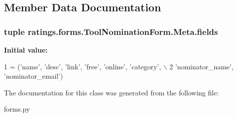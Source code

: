 \subsection{Member Data Documentation}
\hypertarget{classratings_1_1forms_1_1ToolNominationForm_1_1Meta_a1193d82ba3689ee8fcd68dc919d9b375}{
\subsubsection[{fields}]{\setlength{\rightskip}{0pt plus 5cm}tuple ratings.\-forms.\-Tool\-Nomination\-Form.\-Meta.\-fields\hspace{0.3cm}{\ttfamily [static]}}}\label{classratings_1_1forms_1_1ToolNominationForm_1_1Meta_a1193d82ba3689ee8fcd68dc919d9b375}
{\bfseries Initial value\-:}
\begin{DoxyCode}
1 = (\textcolor{stringliteral}{'name'}, \textcolor{stringliteral}{'desc'}, \textcolor{stringliteral}{'link'}, \textcolor{stringliteral}{'free'}, \textcolor{stringliteral}{'online'}, \textcolor{stringliteral}{'category'}, \(\backslash\)
2             \textcolor{stringliteral}{'nominator\_name'}, \textcolor{stringliteral}{'nominator\_email'})
\end{DoxyCode}


The documentation for this class was generated from the following file\-:\begin{DoxyCompactItemize}
\item 
forms.\-py\end{DoxyCompactItemize}
